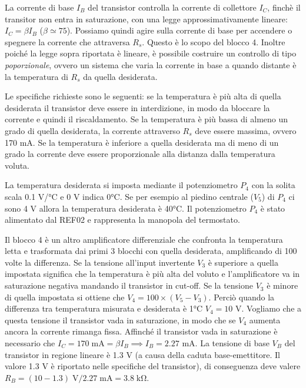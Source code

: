 La corrente di base $I_B$ del transistor controlla la corrente di collettore $I_C$, finchè il transitor non entra in saturazione,
con una legge approssimativamente lineare: $I_C = \beta I_B$ ($\beta \simeq 75$). Possiamo quindi agire sulla corrente di base
per accendere o spegnere la corrente che attraversa $R_s$. Questo è lo scopo del blocco 4. Inoltre poiché la legge sopra riportata
è lineare, è possibile costruire un controllo di tipo \emph{poporzionale}, ovvero un sistema che varia la corrente in base a quando
distante è la temperatura di $R_s$ da quella desiderata.

Le specifiche richieste sono le seguenti: se la temperatura è più alta di quella desiderata il transistor deve essere in interdizione,
in modo da bloccare la corrente e quindi il riscaldamento. Se la temperatura è più bassa di almeno un grado di quella desiderata,
la corrente attraverso $R_s$ deve essere massima, ovvero 170 mA. Se la temperatura è inferiore a quella desiderata ma di meno di un grado
la corrente deve essere proporzionale alla distanza dalla temperatura voluta.

La temperatura desiderata si imposta mediante il potenziometro $P_4$ con la solita scala 0.1 V/\si{\celsius} e 0 V indica 0\si{\celsius}.
Se per esempio al piedino centrale ($V_5$) di $P_4$ ci sono 4 V allora la temperatura desiderata è 40\si{\celsius}. Il potenziometro $P_4$
è stato alimentato dal REF02 e rappresenta la manopola del termostato.

Il blocco 4 è un altro amplificatore differenziale che confronta la temperatura letta e trasformata dai primi 3 blocchi con quella desiderata,
amplificando di 100 volte la differenza. Se la tensione all'input invertente $V_3$ è superiore a quella impostata significa che la temperatura
è più alta del voluto e l'amplificatore va in saturazione negativa mandando il transistor in cut-off. Se la tensione $V_3$ è minore
di quella impostata si ottiene che $V_4 = 100\times(V_5 - V_3)$. Perciò quando la differenza tra temperatura misurata e desiderata è 1\si{\celsius}
$V_4 = 10$ V. Vogliamo che a questa tensione il transistor vada in saturazione, in modo che se $V_4$ aumenta ancora la corrente rimanga fissa.
Affinché il transistor vada in saturazione è necessario che $I_C = 170 \;\si{\milli\ampere} = \beta I_B \implies I_B = 2.27$ mA.
La tensione di base $V_B$ del transistor in regione lineare è 1.3 V (a causa della caduta base-emettitore. Il valore 1.3 V è
riportato nelle specifiche del transistor), di conseguenza deve valere $R_B = (10 - 1.3) \;\si{\volt} / 2.27\;\si{\milli\ampere} = 3.8\;\si{\kilo\ohm}$.

